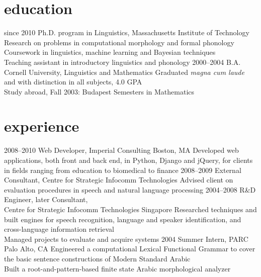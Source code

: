 \documentclass[]{friggeri-cv}
\begin{document}
\section{education}

\begin{entrylist}
  \entry
    {since 2010}
    {Ph.D. program in Linguistics, Massachusetts Institute of Technology}
    {}
    {%
     Research on problems in computational morphology and formal phonology \\
     Coursework in linguistics, machine learning and Bayesian techniques   \\
     Teaching assistant in introductory linguistics and phonology
    }
  \entry
    {2000--2004}
    {B.A. Cornell University, Linguistics and Mathematics}
    {}
    {Graduated \emph{magna cum laude} and with distinction in all subjects, 4.0 GPA \\
	Study abroad, Fall 2003: Budapest Semesters in Mathematics}
\end{entrylist}

\section{experience}

\begin{entrylist}
  \entry
    {2008--2010}
    {Web Developer, Imperial Consulting}
    {Boston, MA}
    {Developed web applications, both front and back end, in Python, Django and jQuery,
     for clients in fields ranging from education to biomedical to finance}
  \entry
    {2008--2009}
    {External Consultant, Centre for Strategic Infocomm Technologies}
    {}
    {Advised client on evaluation procedures in speech and natural language processing}
  \entry
    {2004--2008}
    {R\&D Engineer, later Consultant, \\ Centre for Strategic Infocomm Technologies}
    {Singapore}
    {Researched techniques and built engines for speech recognition, language and speaker identification, and cross-language information retrieval \\
    Managed projects to evaluate and acquire systems}
  \entry
    {2004}
    {Summer Intern, PARC}
    {Palo Alto, CA}
    {Engineered a computational Lexical Functional Grammar to cover the basic sentence constructions of Modern Standard Arabic \\
Built a root-and-pattern-based finite state Arabic morphological analyzer}
\end{entrylist}
\end{document}
